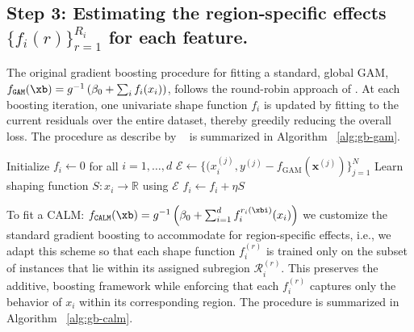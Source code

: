 \subsection{Step 3: Estimating the region‑specific effects $\{f_i{(r)}\}_{r=1}^{R_i}$ for each feature.}

The original gradient boosting procedure for fitting a standard, global GAM, \( f_{\texttt{GAM}}(\xb) =  g^{-1} \left ( \beta_0 + \sum_{i} f_i(x_i) \right ) \), follows the round-robin approach of \cite{friedman2001greedy}.  At each boosting iteration, one univariate shape function \(f_i\) is updated by fitting to the current residuals over the entire dataset, thereby greedily reducing the overall loss. 
The procedure as describe by ~\cite{lou2012intelligible} is summarized in Algorithm ~\ref{alg:gb-gam}.

\begin{algorithm}[tb]
\caption{Gradient Boosting for GAM}
\label{alg:gb-gam}
\begin{algorithmic}[1]
   \STATE Initialize $f_i \leftarrow 0$ for all $i = 1, \dots, d$
         \STATE $\mathcal{E} \leftarrow \{(x^{(j)}_i, y^{(j)} - f_{\text{GAM}}(\mathbf{x}^{(j)})\}_{j=1}^N$ 
         \STATE Learn shaping function $S : x_i \rightarrow \mathbb{R}$ using $\mathcal{E}$ 
         \STATE $f_i \leftarrow f_i + \eta S$ 
      \ENDFOR
   \ENDFOR
\end{algorithmic}
\end{algorithm}

To fit a CALM: $f_{\texttt{CALM}}(\xb) = g^{-1} \left (  \beta_0 + \sum_{i=1}^d f_i^{r_i(\xbi)}(x_i) \right )$ we customize the standard gradient boosting to accommodate for region-specific effects, i.e., we adapt this scheme so that each shape function \(f_i^{(r)}\) is trained only on the subset of instances that lie within its assigned subregion \(\mathcal{R}_i^{(r)}\).  This preserves the additive, boosting framework while enforcing that each \(f_i^{(r)}\) captures only the behavior of \(x_i\) within its corresponding region.
The procedure is summarized in Algorithm ~\ref{alg:gb-calm}.

